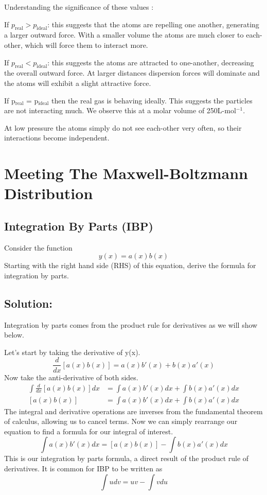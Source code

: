 \documentclass{article}
\newcommand{\be}{\begin{equation}}
\newcommand{\ee}{\end{equation}}
\begin{document}
Understanding the significance of these values : 

If $p_{\text{real}} > p_{\text{ideal}}$: this suggests that the atoms are repelling one another, generating a larger outward force. 
With a smaller volume the atoms are much closer to each-other, which will force them to interact more.

If $p_{\text{real}}<p_{\text{ideal}}$:
this suggests the atoms are attracted to one-another, decreasing the overall outward force.
At larger distances dispersion forces will dominate and the atoms will exhibit a slight attractive force.

If p$_{\text{real}}$ = p$_{\text{ideal}}$ then the real gas is behaving ideally.
This suggests the particles are not interacting much.
We observe this at a molar volume of 250L-mol$^{-1}$. 

At low pressure the atoms simply do not see each-other very often, so their interactions become independent. 
 
\section{Meeting The Maxwell-Boltzmann Distribution}

\subsection{Integration By Parts (IBP)}
Consider the function
\be
y(x) = a(x) b(x)
\ee
Starting with the right hand side (RHS) of this equation, derive the formula for integration by parts.

\subsection*{Solution:}
Integration by parts comes from the product rule for derivatives as we will show below. 

Let's start by taking the derivative of y(x).
\begin{equation}
    \frac{d}{dx}\left[a(x)b(x)\right] = a(x)b'(x) + b(x)a'(x)
\end{equation}
Now take the anti-derivative of both sides. 
\begin{equation}
    \begin{split}
        \int\frac{d}{dx}\left[a(x)b(x)\right]dx &= \int a(x)b'(x) dx+ \int b(x)a'(x) dx\\
         \left[a(x)b(x)\right] &= \int a(x)b'(x) dx+ \int b(x)a'(x)dx 
    \end{split}
\end{equation}
The integral and derivative operations are inverses from the fundamental theorem of calculus, allowing us to cancel terms. 
Now we can simply rearrange our equation to find a formula for our integral of interest. 
\begin{equation}
    \int a(x)b'(x) dx =  \left[a(x)b(x)\right] - \int b(x)a'(x) dx
\end{equation}
This is our integration by parts formula, a direct result of the product rule of derivatives. 
It is common for IBP to be written as 
\be
\int udv = uv - \int vdu
\ee
\end{document}

